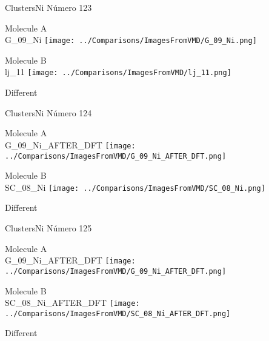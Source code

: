\vtab[-3cm]
\begin{center}
{\large ClustersNi \tab Número 123}
\end{center}
\begin{multicols}{2}
\begin{center}
Molecule A \\ 
G\_09\_Ni
\texttt{[image: ../Comparisons/ImagesFromVMD/G\_09\_Ni.png]}
\\
\vtab

\columnbreak
Molecule B \\ 
lj\_11
\texttt{[image: ../Comparisons/ImagesFromVMD/lj\_11.png]}
\\
\vtab


\end{center}
\end{multicols}
\begin{center}
\textcolor{NavyBlue}{\Large Different}
\end{center}

 \newpage

\vtab[-3cm]
\begin{center}
{\large ClustersNi \tab Número 124}
\end{center}
\begin{multicols}{2}
\begin{center}
Molecule A \\ 
G\_09\_Ni\_AFTER\_DFT
\texttt{[image: ../Comparisons/ImagesFromVMD/G\_09\_Ni\_AFTER\_DFT.png]}
\\
\vtab

\columnbreak
Molecule B \\ 
SC\_08\_Ni
\texttt{[image: ../Comparisons/ImagesFromVMD/SC\_08\_Ni.png]}
\\
\vtab


\end{center}
\end{multicols}
\begin{center}
\textcolor{NavyBlue}{\Large Different}
\end{center}

 \newpage

\vtab[-3cm]
\begin{center}
{\large ClustersNi \tab Número 125}
\end{center}
\begin{multicols}{2}
\begin{center}
Molecule A \\ 
G\_09\_Ni\_AFTER\_DFT
\texttt{[image: ../Comparisons/ImagesFromVMD/G\_09\_Ni\_AFTER\_DFT.png]}
\\
\vtab

\columnbreak
Molecule B \\ 
SC\_08\_Ni\_AFTER\_DFT
\texttt{[image: ../Comparisons/ImagesFromVMD/SC\_08\_Ni\_AFTER\_DFT.png]}
\\
\vtab


\end{center}
\end{multicols}
\begin{center}
\textcolor{NavyBlue}{\Large Different}
\end{center}

